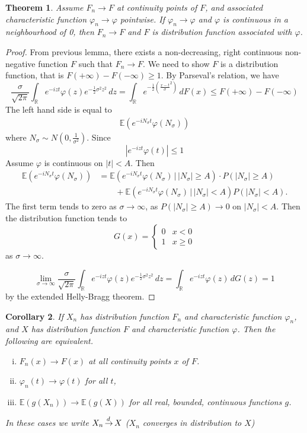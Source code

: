 \documentclass[10pt, oneside, reqno]{amsart}
\theoremstyle{plain}%
\newtheorem{thm}{Theorem}[section]
\newtheorem{cor}[thm]{Corollary}
\theoremstyle{definition}
\theoremstyle{remark}
\newcommand{\given}{ \, | \,}
\renewcommand{\phi}{\varphi}
\newcommand{\R}{\mathbb{R}}
\newcommand{\E}{\mathbb{E}}
\def\cid{\,{\buildrel \!d \over \rightarrow}\,}
\begin{document}
\begin{thm}
	Assume $F_n \rightarrow F$ at continuity points of $F$, and associated characteristic function $\phi_n \rightarrow \phi$ pointwise.  If $\phi_n \rightarrow \phi$ and $\phi$ is continuous in a neighbourhood of 0, then $F_n \rightarrow F$ and $F$ is distribution function associated with $\phi$.
\end{thm}

\begin{proof}
	From previous lemma, there exists a non-decreasing, right continuous non-negative function $F$ such that $F_n \rightarrow F$.  We need to show $F$ is a distribution function, that is $F(+ \infty) - F(-\infty) \geq 1$.  By Parseval's relation, we have \[
		\frac{\sigma}{\sqrt{2\pi}} \int_\R e^{-izt} \phi(z) e^{-\frac{1}{2}\sigma^2 z^2}\, dz = \int_\R e^{-\frac{1}{2}\left(\frac{x-t}{\sigma}^2\right)} \, dF(x) \leq F(+\infty) - F(-\infty)
	\]  The left hand side is equal to \begin{align*}
		\E(e^{-i N_\sigma t} \phi(N_\sigma))
	\end{align*} where $N_\sigma \sim N(0, \frac{1}{\sigma^2})$.  Since \[
		\left|e^{-izt} \phi(t) \right| \leq 1
	\] Assume $\phi$ is continuous on $|t| < A$.  Then \begin{align*}
		\E(e^{-iN_\sigma t} \phi(N_\sigma)) &= \E(e^{-iN_\sigma t} \phi(N_\sigma) \given |N_\sigma| \geq A ) \cdot P(|N_\sigma| \geq A) \\
		 				&\qquad + \E(e^{-iN_\sigma t} \phi(N_\sigma) \given |N_\sigma| < A) P(|N_\sigma| < A).
	\end{align*}  The first term tends to zero as $\sigma \rightarrow \infty$, as $P(|N_\sigma| \geq A) \rightarrow 0$ on $|N_\sigma| < A$.  Then the distribution function tends to \[
		G(x) = \begin{cases}
			0 	&x < 0 \\
			1	&x \geq 0 
		\end{cases}
	\] as $\sigma \rightarrow \infty$.  
	
	\[
		\lim_{\sigma \rightarrow \infty}\frac{\sigma}{\sqrt{2\pi}} \int_\R e^{-izt} \phi(z) e^{-\frac{1}{2}\sigma^2 z^2}\, dz = \int_\R e^{-izt} \phi(z) \, dG(z) = 1
	\] by the extended Helly-Bragg theorem.
 \end{proof} 

\begin{cor}
	If $X_n$ has distribution function $F_n$ and characteristic function $\phi_n$, and $X$ has distribution function $F$ and characteristic function $\phi$.  Then the following are equivalent.
	\begin{enumerate}[i)]
		\item $F_n(x) \rightarrow F(x)$ at all continuity points $x$ of $F$.  
		\item $\phi_n(t) \rightarrow \phi(t)$ for all $t$, 
		\item $\E(g(X_n)) \rightarrow \E(g(X))$ for all real, bounded, continuous functions $g$. 
	\end{enumerate}
	In these cases we write $X_n \cid X$ ($X_n$ converges in distribution to $X$)
\end{cor}
\end{document}
